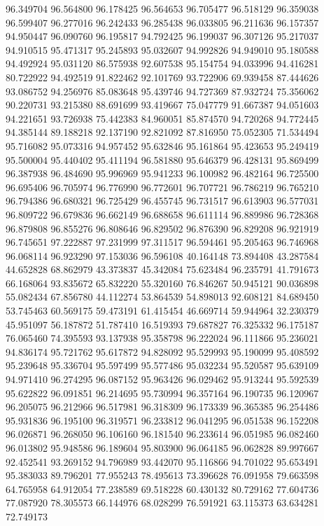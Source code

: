96.349704
96.564800
96.178425
96.564653
96.705477
96.518129
96.359038
96.599407
96.277016
96.242433
96.285438
96.033805
96.211636
96.157357
94.950447
96.090760
96.195817
94.792425
96.199037
96.307126
95.217037
94.910515
95.471317
95.245893
95.032607
94.992826
94.949010
95.180588
94.492924
95.031120
86.575938
92.607538
95.154754
94.033996
94.416281
80.722922
94.492519
91.822462
92.101769
93.722906
69.939458
87.444626
93.086752
94.256976
85.083648
95.439746
94.727369
87.932724
75.356062
90.220731
93.215380
88.691699
93.419667
75.047779
91.667387
94.051603
94.221651
93.726938
75.442383
84.960051
85.874570
94.720268
94.772445
94.385144
89.188218
92.137190
92.821092
87.816950
75.052305
71.534494
95.716082
95.073316
94.957452
95.632846
95.161864
95.423653
95.249419
95.500004
95.440402
95.411194
96.581880
95.646379
96.428131
95.869499
96.387938
96.484690
95.996969
95.941233
96.100982
96.482164
96.725500
96.695406
96.705974
96.776990
96.772601
96.707721
96.786219
96.765210
96.794386
96.680321
96.725429
96.455745
96.731517
96.613903
96.577031
96.809722
96.679836
96.662149
96.688658
96.611114
96.889986
96.728368
96.879808
96.855276
96.808646
96.829502
96.876390
96.829208
96.921919
96.745651
97.222887
97.231999
97.311517
96.594461
95.205463
96.746968
96.068114
96.923290
97.153036
96.596108
40.164148
73.894408
43.287584
44.652828
68.862979
43.373837
45.342084
75.623484
96.235791
41.791673
66.168064
93.835672
65.832220
55.320160
76.846267
50.945121
90.036898
55.082434
67.856780
44.112274
53.864539
54.898013
92.608121
84.689450
53.745463
60.569175
59.473191
61.415454
46.669714
59.944964
32.230379
45.951097
56.187872
51.787410
16.519393
79.687827
76.325332
96.175187
76.065460
74.395593
93.137938
95.358798
96.222024
96.111866
95.236021
94.836174
95.721762
95.617872
94.828092
95.529993
95.190099
95.408592
95.239648
95.336704
95.597499
95.577486
95.032234
95.520587
95.639109
94.971410
96.274295
96.087152
95.963426
96.029462
95.913244
95.592539
95.622822
96.091851
96.214695
95.730994
96.357164
96.190735
96.120967
96.205075
96.212966
96.517981
96.318309
96.173339
96.365385
96.254486
95.931836
96.195100
96.319571
96.233812
96.041295
96.051538
96.152208
96.026871
96.268050
96.106160
96.181540
96.233614
96.051985
96.082460
96.013802
95.948586
96.189604
95.803900
96.064185
96.062828
89.997667
92.452541
93.269152
94.796989
93.442070
95.116866
94.701022
95.653491
95.383033
89.796201
77.955243
78.495613
73.396628
76.091958
79.663598
64.765958
64.912054
77.238589
69.518228
60.430132
80.729162
77.604736
77.087920
78.305573
66.144976
68.028299
76.591921
63.115373
63.634281
72.749173
